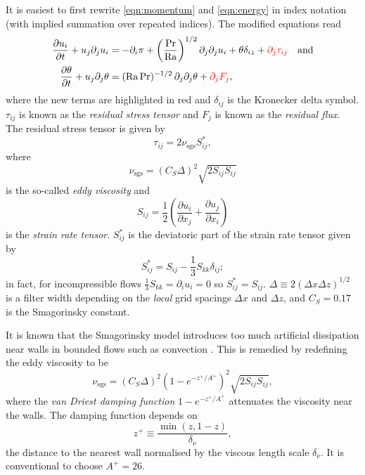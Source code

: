 \documentclass[../main.tex]{subfiles}
\begin{document}
It is easiest to first rewrite \cref{eqn:momentum} and \cref{eqn:energy} in
index notation (with implied summation over repeated indices). The modified
equations read
\begin{align}
    \label{eqn:momentum_idx}
    \frac{\partial u_i}{\partial t} + u_j \partial_j u_i
        &= -\partial_i \pi + \left(\frac{\mathrm{Pr}}{\mathrm{Ra}}\right)^{1/2}
            \partial_j \partial_j u_i + \theta \delta_{iz}
            + {\color{red} \partial_j \tau_{ij}} \quad \text{and} \\
    \label{eqn:energy_idx}
    \frac{\partial \theta}{\partial t} + u_j \partial_j \theta
        &= (\mathrm{Ra}\,\mathrm{Pr})^{-1/2} \, \partial_j \partial_j \theta
            + {\color{red} \partial_j F_j},
\end{align}
where the new terms are highlighted in red and $\delta_{ij}$ is the Kronecker
delta symbol. $\tau_{ij}$ is known as the \emph{residual stress tensor} and
$F_j$ is known as the \emph{residual flux}. The residual stress tensor is given
by
\[
    \tau_{ij} = 2 \nu_\mathrm{sgs} S_{ij}^*,
\]
where
\[
    \nu_\mathrm{sgs} = (C_S \Delta)^2 \sqrt{2 S_{ij} S_{ij}}
\]
is the so-called \emph{eddy viscosity} and
\[
    S_{ij} = \frac{1}{2} \left( \frac{\partial u_i}{\partial x_j} + \frac{\partial u_j}{\partial x_i} \right)
\]
is the \emph{strain rate tensor}. $S_{ij}^*$ is the deviatoric part of the
strain rate tensor given by
\[
    S_{ij}^* = S_{ij} - \frac{1}{3} S_{kk} \delta_{ij};
\]
in fact, for incompressible flows $\frac{1}{3} S_{kk} = \partial_i u_i = 0$ so
$S_{ij}^* = S_{ij}$. $\Delta \equiv 2 (\Delta x \Delta z)^{1/2}$ is
a filter width depending on the \emph{local} grid spacings $\Delta x$ and
$\Delta z$, and $C_S = 0.17$ is the Smagorinsky constant.

It is known that the Smagorinsky model introduces too much artificial
dissipation near walls in bounded flows such as \rb{} convection
\parencite{pope2000}. This is remedied by redefining the eddy viscosity to be
\[
    \nu_\mathrm{sgs}
        = (C_S \Delta)^2 (1 - e^{-z^+/A^+})^2 \sqrt{2 S_{ij} S_{ij}},
\]
where the \emph{van Driest damping function} $1 - e^{-z^+/A^+}$ attenuates
the viscosity near the walls. The damping function depends on
\[
    z^+ \equiv \frac{\min(z,1-z)}{\delta_\nu},
\]
the distance to the nearest wall normalised by the viscous length scale
$\delta_\nu$. It is conventional to choose $A^+ = 26$.
\end{document}
